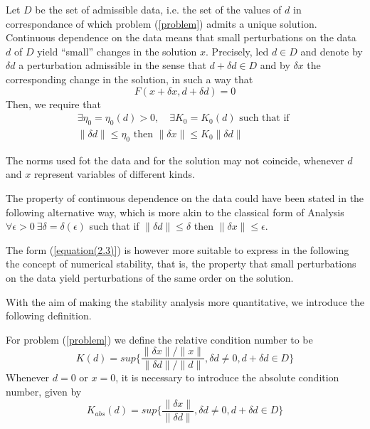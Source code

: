 Let $D$ be the set of admissible data, i.e. the set of the values of $d$ in correspondance of which problem (\ref{problem}) admits a unique solution. Continuous dependence on the data means that small perturbations on the data $d$ of $D$ yield ``small'' changes in the solution $x$. Precisely, led $d \in D$ and denote by $\delta d$ a perturbation admissible in the sense that $d + \delta d \in D$ and by $\delta x$ the corresponding change in the solution, in such a way that
\begin{equation}
    F(x + \delta x, d + \delta d) = 0
    \label{equation 2.2}
\end{equation}
Then, we require that
\begin{multline}
    \exists \eta_0 =\eta_0(d) > 0, \quad \exists K_0 = K_0 (d) \text{ such that if } \\
     \| \delta d \| \leq \eta_0 \text{ then } \| \delta x \| \leq K_0 \| \delta d \|
     \label{equation(2.3)}
\end{multline}

The norms used fot the data and for the solution may not coincide, whenever $d$ and $x$ represent variables of different kinds.

\begin{remark}
    The property of continuous dependence on the data could have been stated in the following alternative way, which is more akin to the classical form of Analysis $\forall \epsilon > 0\ \exists \delta = \delta (\epsilon)$ such that if $\| \delta d \| \leq \delta$ then $\| \delta x \| \leq \epsilon$.
    
    The form (\ref{equation(2.3)}) is however more suitable to express in the following the concept of numerical stability, that is, the property that small perturbations on the data yield perturbations of the same order on the solution.
\end{remark}

With the aim of making the stability analysis more quantitative, we introduce the following definition.

\begin{definition}
    For problem (\ref{problem}) we define the relative condition number to be
    \begin{equation}
        K(d) = sup\{ \frac{\| \delta x \| / \| x \|}{\| \delta d \| / \|d \|}, \delta d \neq 0, d + \delta d \in D \}
        \label{equation 2.4}
    \end{equation}
    Whenever $d = 0$ or $x = 0$, it is necessary to introduce the absolute condition number, given by
    \begin{equation}
        K_{abs}(d) = sup \{ \frac{ \| \delta x \|}{ \| \delta d \|}, \delta d \neq 0, d + \delta d \in D \}
        \label{equation 2.5}
    \end{equation}
\end{definition}

